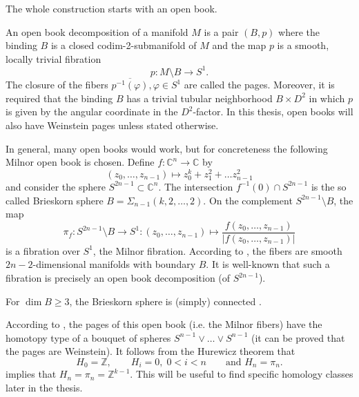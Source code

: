The whole construction starts with an open book.

\begin{definition}\label{def:open_book_1}
    An open book decomposition of a manifold $M$ is a pair $(B,p)$ where the binding $B$ is a closed codim-2-submanifold of $M$ and the map $p$ is a smooth, locally trivial fibration
    \[
        p: M\setminus B \to S^1.
    \]
    The closure of the fibers $\overline{p^{-1}(\varphi)}, \varphi \in S^1$ are called the pages.
    Moreover, it is required that the binding $B$ has a trivial tubular neighborhood $B\times D^2$ in which $p$ is given by the angular coordinate in the $D^2$-factor.
    In this thesis, open books will also have Weinstein pages unless stated otherwise.
\end{definition}

In general, many open books would work, but for concreteness the following Milnor open book is chosen.
Define $f\colon \mathbb C^n \to \mathbb C$ by
\[
    (z_0, \dots, z_{n-1}) \mapsto z_0^k + z_1^2 + \dots z_{n-1}^2
\]
and consider the sphere $S^{2n-1} \subset \mathbb C^n$.
The intersection $f^{-1}(0) \cap S^{2n-1}$ is the so called Brieskorn sphere $B = \Sigma_{n-1}(k,2,\dots,2)$.
On the complement $S^{2n-1} \setminus B$, the map
\[
    \pi_f\colon S^{2n-1}\setminus B \to S^1\colon (z_0, \dots, z_{n-1}) \mapsto \frac{f(z_0, \dots, z_{n-1})}{|f(z_0, \dots, z_{n-1})|}
\]
is a fibration over $S^1$, the Milnor fibration.
According to \cite[Lemma 6.1]{Milnor69}, the fibers are smooth $2n-2$-dimensional manifolds with boundary $B$.
It is well-known that such a fibration is precisely an open book decomposition (of $S^{2n-1}$).

For $\dim B \geq 3$, the Brieskorn sphere is (simply) connected \cite[Lemma 2]{Brieskorn66}.

According to \cite[Thm 6.5]{Milnor69}, the pages of this open book (i.e. the Milnor fibers) have the homotopy type of a bouquet of spheres 
$S^{n-1} \vee \dots \vee S^{n-1}$ (it can be proved that the pages are Weinstein).
It follows from the Hurewicz theorem that 
\[
    H_0 = \mathbb Z, \qquad H_i = 0, \; 0 < i < n \qquad \text{and } H_n = \pi_n.
\]
\cite[Theorem 9.1]{Milnor69} implies that $H_n = \pi_n = \mathbb Z^{k-1}$.
This will be useful to find specific homology classes later in the thesis.